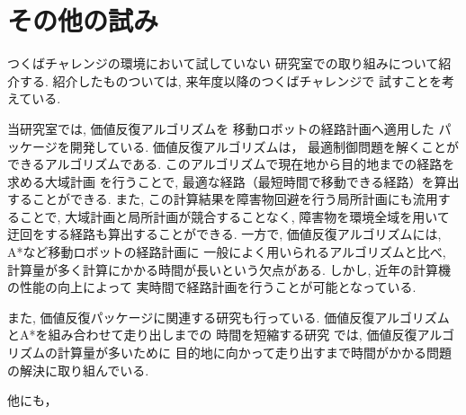 \documentclass[twocolumn,9pt]{jsproceedings}
\begin{document}
\section{その他の試み}

つくばチャレンジの環境において試していない
研究室での取り組みについて紹介する. 
紹介したものついては, 来年度以降のつくばチャレンジで
試すことを考えている. 

当研究室では, 価値反復アルゴリズムを
移動ロボットの経路計画へ適用した
パッケージを開発している\cite{ueda2023JRM}. 
価値反復アルゴリズムは，
最適制御問題を解くことができるアルゴリズムである. \cite{上田詳解}
このアルゴリズムで現在地から目的地までの経路を求める大域計画
を行うことで, 最適な経路（最短時間で移動できる経路）を算出することができる. 
また, この計算結果を障害物回避を行う局所計画にも流用することで, 
大域計画と局所計画が競合することなく, 
障害物を環境全域を用いて迂回をする経路も算出することができる. 
一方で, 価値反復アルゴリズムには, A*など移動ロボットの経路計画に
一般によく用いられるアルゴリズムと比べ, 
計算量が多く計算にかかる時間が長いという欠点がある. 
しかし, 近年の計算機の性能の向上によって
実時間で経路計画を行うことが可能となっている. 

また, 価値反復パッケージに関連する研究も行っている. 
価値反復アルゴリズムとA*を組み合わせて走り出しまでの
時間を短縮する研究\cite{中村2024}
では, 価値反復アルゴリズムの計算量が多いために
目的地に向かって走り出すまで時間がかかる問題の解決に取り組んでいる. 

他にも，





\end{document}
